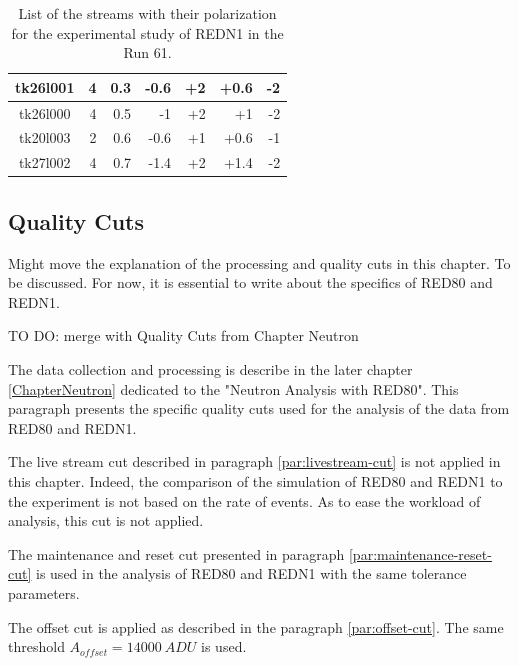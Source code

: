 \begin{table}[]
\begin{tabular}{c|rrrrrr}
tk26l001  & 4                  & 0.3                  & -0.6                  & +2                  & +0.6                  & -2                  \\ \hline
tk26l000  & 4                  & 0.5                  & -1                    & +2                  & +1                    & -2                  \\ \hline
tk20l003  & 2                  & 0.6                  & -0.6                  & +1                  & +0.6                  & -1                  \\ \hline
tk27l002  & 4                  & 0.7                  & -1.4                  & +2                  & +1.4                  & -2                 
\end{tabular}%
\caption{List of the streams with their polarization for the experimental study of REDN1 in the Run 61.}
\label{tab:redn1-stream-list}
\end{table}


\subsection{Quality Cuts}

{\color{red} Might move the explanation of the processing and quality cuts in this chapter. To be discussed. For now, it is essential to write about the specifics of RED80 and REDN1.

TO DO: merge with Quality Cuts from Chapter Neutron
}

The data collection and processing is describe in the later chapter \ref{ChapterNeutron} dedicated to the "Neutron Analysis with RED80". This paragraph presents the specific quality cuts used for the analysis of the data from RED80 and REDN1.

The live stream cut described in paragraph \ref{par:livestream-cut} is not applied in this chapter. Indeed, the comparison of the simulation of RED80 and REDN1 to the experiment is not based on the rate of events. As to ease the workload of analysis, this cut is not applied.

The maintenance and reset cut presented in paragraph \ref{par:maintenance-reset-cut} is used in the analysis of RED80 and REDN1 with the same tolerance parameters.

The offset cut is applied as described in the paragraph \ref{par:offset-cut}. The same threshold $A_{offset}=\SI{14000}{ADU}$ is used.

